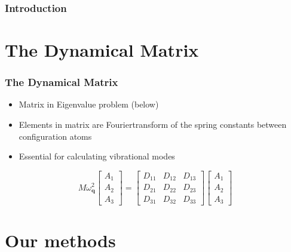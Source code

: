 \documentclass[hyperref={colorlinks=true,urlcolor=blue,linkcolor=.},aspectratio=1610,mathserif]{beamer}
\begin{document}
\begin{frame}
 \frametitle{Introduction}
\end{frame}

\section{The Dynamical Matrix}

\begin{frame}
 \frametitle{The Dynamical Matrix}
 \begin{itemize}[<+->]
  \pause
  \item Matrix in Eigenvalue problem (below)
  \item Elements in matrix are Fouriertransform of the spring constants between configuration atoms
  \item Essential for calculating vibrational modes
 \end{itemize}
 \begin{equation}
  M\omega_{\mathbf{q}}^{2}
  \begin{bmatrix}
   A_{1} \\
   A_{2} \\
   A_{3}
  \end{bmatrix}
  =
  \begin{bmatrix}
   D_{11} & D_{12} & D_{13} \\
   D_{21} & D_{22} & D_{23} \\
   D_{31} & D_{32} & D_{33}
  \end{bmatrix}\begin{bmatrix}
   A_{1} \\
   A_{2} \\
   A_{3}
  \end{bmatrix} \nonumber
 \end{equation}
\end{frame}

\section{Our methods}
\end{document}
